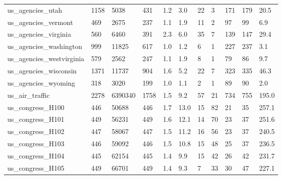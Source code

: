 \begin{longtable}{lllllllllll}
 us\_agencies\_utah                                   & 1158       & 5038      & 431   & 1.2    & 3.0    & 22    & 3      & 171    & 179    & 20.5    \\
 us\_agencies\_vermont                                & 469        & 2675      & 237   & 1.1    & 1.9    & 11    & 2      & 97     & 99     & 6.9     \\
 us\_agencies\_virginia                               & 560        & 6460      & 391   & 2.3    & 6.0    & 35    & 7      & 139    & 147    & 29.4    \\
 us\_agencies\_washington                             & 999        & 11825     & 617   & 1.0    & 1.2    & 6     & 1      & 227    & 237    & 3.1     \\
 us\_agencies\_westvirginia                           & 579        & 2562      & 247   & 1.1    & 1.9    & 8     & 1      & 79     & 86     & 9.7     \\
 us\_agencies\_wisconsin                              & 1371       & 11737     & 904   & 1.6    & 5.2    & 22    & 7      & 323    & 335    & 46.3    \\
 us\_agencies\_wyoming                                & 318        & 3020      & 199   & 1.0    & 1.1    & 2     & 1      & 89     & 90     & 2.0     \\
 us\_air\_traffic                                     & 2278       & 6390340   & 1758  & 1.5    & 9.2    & 57    & 21     & 734    & 755    & 195.0   \\
 us\_congress\_H100                                   & 446        & 50688     & 446   & 1.7    & 13.0   & 15    & 82     & 21     & 35     & 257.1   \\
 us\_congress\_H101                                   & 449        & 56231     & 449   & 1.6    & 12.1   & 14    & 70     & 23     & 37     & 251.6   \\
 us\_congress\_H102                                   & 447        & 58067     & 447   & 1.5    & 11.2   & 16    & 56     & 23     & 37     & 240.5   \\
 us\_congress\_H103                                   & 446        & 59092     & 446   & 1.5    & 10.8   & 15    & 48     & 25     & 37     & 236.5   \\
 us\_congress\_H104                                   & 445        & 62154     & 445   & 1.4    & 9.9    & 15    & 42     & 26     & 42     & 231.7   \\
 us\_congress\_H105                                   & 449        & 66701     & 449   & 1.4    & 9.3    & 7     & 33     & 30     & 47     & 227.1   \\

\end{longtable}

